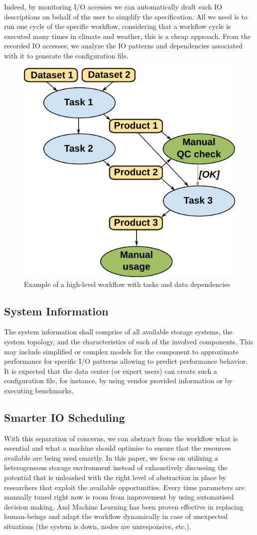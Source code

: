 \documentclass[a4paper]{article}
\begin{document}
Indeed, by monitoring I/O accesses we can automatically draft such IO descriptions on behalf of the user to simplify the specification.
All we need is to run one cycle of the specific workflow, considering that a workflow cycle is executed many times in climate and weather, this is a cheap approach.
From the recorded IO accesses, we analyze the IO patterns and dependencies associated with it to generate the configuration file.

\begin{figure}[H]
  \centering
  \includegraphics[width=0.4\columnwidth]{workflow}
  \caption{Example of a high-level workflow with tasks and data dependencies}
  \label{fig:workflow}
\end{figure}

\subsection{System Information}

The system information shall comprise of all available storage systems, the system topology, and the characteristics of each of the involved components.
This may include simplified or complex models for the component to approximate performance for specific I/O patterns allowing to predict performance behavior.
It is expected that the data center (or expert users) can create such a configuration file, for instance, by using vendor provided information or by executing benchmarks.

\subsection{Smarter IO Scheduling}

With this separation of concerns, we can abstract from the workflow what is essential and what a machine should optimise to ensure that the resources available are being used smartly.
In this paper, we focus on utilizing a heterogeneous storage environment instead of exhaustively discussing the potential that is unleashed with the right level of abstraction in place by researchers that exploit the available opportunities.
Every time parameters are manually tuned right now is room from improvement by using automatised decision making.
And Machine Learning has been proven effective in replacing human-beings and adapt the workflow dynamically in case of unexpected situations (the system is down, nodes are unresponsive, etc.).
\end{document}
